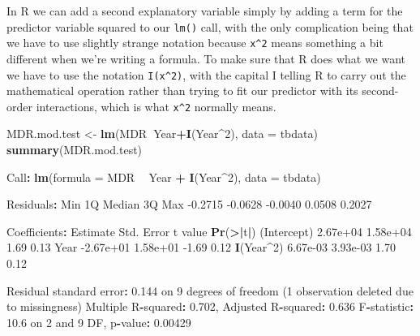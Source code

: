 \documentclass[
]{book}
\newenvironment{Shaded}{\begin{snugshade}}{\end{snugshade}}
\newcommand{\DataTypeTok}[1]{\textcolor[rgb]{0.13,0.29,0.53}{#1}}
\newcommand{\DecValTok}[1]{\textcolor[rgb]{0.00,0.00,0.81}{#1}}
\newcommand{\ErrorTok}[1]{\textcolor[rgb]{0.64,0.00,0.00}{\textbf{#1}}}
\newcommand{\FloatTok}[1]{\textcolor[rgb]{0.00,0.00,0.81}{#1}}
\newcommand{\KeywordTok}[1]{\textcolor[rgb]{0.13,0.29,0.53}{\textbf{#1}}}
\newcommand{\NormalTok}[1]{#1}
\newcommand{\OperatorTok}[1]{\textcolor[rgb]{0.81,0.36,0.00}{\textbf{#1}}}
\newcommand{\StringTok}[1]{\textcolor[rgb]{0.31,0.60,0.02}{#1}}
\begin{document}
In R we can add a second explanatory variable simply by adding a term for the predictor variable squared to our \texttt{lm()} call, with the only complication being that we have to use slightly strange notation because \texttt{x\^{}2} means something a bit different when we're writing a formula. To make sure that R does what we want we have to use the notation \texttt{I(x\^{}2)}, with the capital I telling R to carry out the mathematical operation rather than trying to fit our predictor with its second-order interactions, which is what \texttt{x\^{}2} normally means.

\begin{Shaded}
\begin{Highlighting}[]
\NormalTok{MDR.mod.test <-}\StringTok{ }\KeywordTok{lm}\NormalTok{(MDR}\OperatorTok{~}\NormalTok{Year}\OperatorTok{+}\KeywordTok{I}\NormalTok{(Year}\OperatorTok{^}\DecValTok{2}\NormalTok{), }\DataTypeTok{data =}\NormalTok{ tbdata)}
\KeywordTok{summary}\NormalTok{(MDR.mod.test)}

\NormalTok{Call}\OperatorTok{:}
\KeywordTok{lm}\NormalTok{(}\DataTypeTok{formula =}\NormalTok{ MDR }\OperatorTok{~}\StringTok{ }\NormalTok{Year }\OperatorTok{+}\StringTok{ }\KeywordTok{I}\NormalTok{(Year}\OperatorTok{^}\DecValTok{2}\NormalTok{), }\DataTypeTok{data =}\NormalTok{ tbdata)}

\NormalTok{Residuals}\OperatorTok{:}
\StringTok{    }\NormalTok{Min      1Q  Median      3Q     Max }
\FloatTok{-0.2715} \FloatTok{-0.0628} \FloatTok{-0.0040}  \FloatTok{0.0508}  \FloatTok{0.2027} 

\NormalTok{Coefficients}\OperatorTok{:}
\StringTok{             }\NormalTok{Estimate Std. Error t value }\KeywordTok{Pr}\NormalTok{(}\OperatorTok{>}\ErrorTok{|}\NormalTok{t}\OperatorTok{|}\NormalTok{)}
\NormalTok{(Intercept)  }\FloatTok{2.67e+04}   \FloatTok{1.58e+04}    \FloatTok{1.69}     \FloatTok{0.13}
\NormalTok{Year        }\FloatTok{-2.67e+01}   \FloatTok{1.58e+01}   \FloatTok{-1.69}     \FloatTok{0.12}
\KeywordTok{I}\NormalTok{(Year}\OperatorTok{^}\DecValTok{2}\NormalTok{)    }\FloatTok{6.67e-03}   \FloatTok{3.93e-03}    \FloatTok{1.70}     \FloatTok{0.12}

\NormalTok{Residual standard error}\OperatorTok{:}\StringTok{ }\FloatTok{0.144}\NormalTok{ on }\DecValTok{9}\NormalTok{ degrees of freedom}
\NormalTok{  (}\DecValTok{1}\NormalTok{ observation deleted due to missingness)}
\NormalTok{Multiple R}\OperatorTok{-}\NormalTok{squared}\OperatorTok{:}\StringTok{  }\FloatTok{0.702}\NormalTok{, Adjusted R}\OperatorTok{-}\NormalTok{squared}\OperatorTok{:}\StringTok{  }\FloatTok{0.636} 
\NormalTok{F}\OperatorTok{-}\NormalTok{statistic}\OperatorTok{:}\StringTok{ }\FloatTok{10.6}\NormalTok{ on }\DecValTok{2}\NormalTok{ and }\DecValTok{9}\NormalTok{ DF,  p}\OperatorTok{-}\NormalTok{value}\OperatorTok{:}\StringTok{ }\FloatTok{0.00429}
\end{Highlighting}
\end{Shaded}
\end{document}
